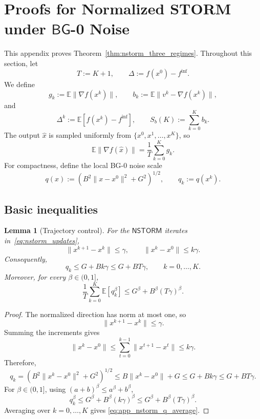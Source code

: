 \documentclass[letter,11pt]{article}
\newtheorem{lemma}[]{Lemma}
\newcommand{\E}{\mathbb{E}}
\begin{document}
\section{Proofs for Normalized STORM under \texorpdfstring{$\mathsf{BG}$}{BG}-0 Noise}
\label{apdx:nstorm_proofs}

This appendix proves Theorem~\ref{thm:nstorm_three_regimes}. Throughout this
section, let
\[
    T:=K+1,
    \qquad
    \Delta:=f(x^0)-f^{\inf}.
\]
We define
\[
    g_k:=\E\|\nabla f(x^k)\|,
    \qquad
    b_k:=\E\|v^k-\nabla f(x^k)\|,
\]
and
\[
    \Delta^k:=\E[f(x^k)-f^{\inf}],
    \qquad
    S_b(K):=\sum_{k=0}^K b_k.
\]
The output \(\widehat x\) is sampled uniformly from
\(\{x^0,x^1,\ldots,x^K\}\), so
\begin{equation}
\label{eq:app_nstorm_uniform_output}
    \E\|\nabla f(\widehat x)\|
    =
    \frac1T\sum_{k=0}^K g_k.
\end{equation}
For compactness, define the local BG-0 noise scale
\[
    q(x):=\left(B^2\|x-x^0\|^2+G^2\right)^{1/2},
    \qquad
    q_k:=q(x^k).
\]

\subsection{Basic inequalities}
\label{app:nstorm_basic}

\begin{lemma}[Trajectory control]
\label{lem:app_nstorm_traj}
For the \(\mathsf{NSTORM}\) iterates in~\eqref{eq:nstorm_updates},
\[
    \|x^{k+1}-x^k\|\le\gamma,
    \qquad
    \|x^k-x^0\|\le k\gamma.
\]
Consequently,
\[
    q_k\le G+Bk\gamma
    \le G+BT\gamma,
    \qquad
    k=0,\ldots,K.
\]
Moreover, for every \(\beta\in(0,1]\),
\begin{equation}
\label{eq:app_nstorm_q_average}
    \frac1T\sum_{k=0}^K \E[q_k^\beta]
    \le
    G^\beta+B^\beta(T\gamma)^\beta.
\end{equation}
\end{lemma}

\begin{proof}
The normalized direction has norm at most one, so
\[
    \|x^{k+1}-x^k\|\le\gamma.
\]
Summing the increments gives
\[
    \|x^k-x^0\|
    \le
    \sum_{t=0}^{k-1}\|x^{t+1}-x^t\|
    \le
    k\gamma.
\]
Therefore,
\[
    q_k
    =
    \left(B^2\|x^k-x^0\|^2+G^2\right)^{1/2}
    \le
    B\|x^k-x^0\|+G
    \le
    G+Bk\gamma
    \le
    G+BT\gamma.
\]
For \(\beta\in(0,1]\), using \((a+b)^\beta\le a^\beta+b^\beta\),
\[
    q_k^\beta
    \le
    G^\beta+B^\beta(k\gamma)^\beta
    \le
    G^\beta+B^\beta(T\gamma)^\beta.
\]
Averaging over \(k=0,\ldots,K\) gives
\eqref{eq:app_nstorm_q_average}.
\end{proof}
\end{document}
